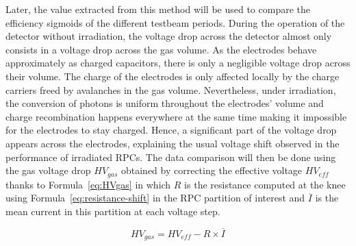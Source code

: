 	Later, the value extracted from this method will be used to compare the efficiency sigmoids of the different testbeam periods. During the operation of the detector without irradiation, the voltage drop across the detector almost only consists in a voltage drop across the gas volume. As the electrodes behave approximately as charged capacitors, there is only a negligible voltage drop across their volume. The charge of the electrodes is only affected locally by the charge carriers freed by avalanches in the gas volume. Nevertheless, under irradiation, the conversion of photons is uniform throughout the electrodes' volume and charge recombination happens everywhere at the same time making it impossible for the electrodes to stay charged. Hence, a significant part of the voltage drop appears across the electrodes, explaining the usual voltage shift observed in the performance of irradiated RPCs. The data comparison will then be done using the gas voltage drop $HV_{gas}$ obtained by correcting the effective voltage $HV_{eff}$ thanks to Formula~\ref{eq:HVgas} in which $R$ is the resistance computed at the knee using Formula~\ref{eq:resistance-shift} in the RPC partition of interest and $\overline{I}$ is the mean current in this partition at each voltage step.
	
	\begin{equation}
	\label{eq:HVgas}
		HV_{gas} = HV_{eff} - R\times\overline{I}
	\end{equation}
	

